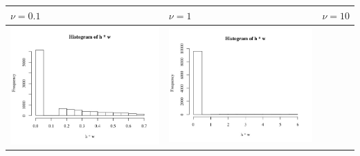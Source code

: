 \documentclass[11pt]{article}
\begin{document}
\begin{table}[h]
  \begin{center}
    \renewcommand{\arraystretch}{1.5}
    \begin{tabular}{| >{\centering\arraybackslash}m{2.1in} |  >{\centering\arraybackslash}m{2.1in} |  >{\centering\arraybackslash}m{2.1in}|}
      \hline
      $\nu=0.1$&$\nu=1$&$\nu=10$\\\hline
      \includegraphics[width=1\linewidth,height=0.18\textheight]{plot2-1-1}&
      \includegraphics[width=1\linewidth,height=0.18\textheight]{plot2-1-2}&

\end{tabular}
\end{center}
\end{table}
\end{document}
